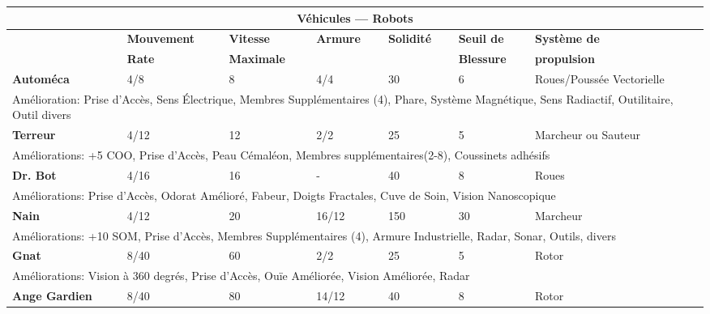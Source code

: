 \begin{table} \begin{tabular}{|l|l|l|l|l|l|l|} \hline

\multicolumn{7}{|c|}{\textbf{Véhicules --- Robots}} \\ \hline

&\textbf{Mouvement}	&\textbf{Vitesse}	&\textbf{Armure}	&\textbf{Solidité}	&\textbf{Seuil de}	&\textbf{Système de} \\ &\textbf{Rate}	&\textbf{Maximale}	&&&\textbf{Blessure}	&\textbf{propulsion} \\ \hline

\textbf{Automéca}	&4/8	&8	&4/4	&30	&6	&Roues/Poussée Vectorielle \\ \hline

\multicolumn{7}{|l|}{Amélioration: Prise d'Accès, Sens Électrique, Membres Supplémentaires (4), Phare, Système Magnétique, Sens Radiactif, Outilitaire, Outil divers} \\ \hline

\textbf{Terreur}	&4/12	&12	&2/2	&25	&5	&Marcheur ou Sauteur\\ \hline

\multicolumn{7}{|l|}{Améliorations: +5 COO, Prise d'Accès, Peau Cémaléon, Membres supplémentaires(2-8), Coussinets adhésifs} \\ \hline

\textbf{Dr. Bot}	&4/16	&16	&- &40	&8	&Roues\\ \hline

\multicolumn{7}{|l|}{Améliorations: Prise d'Accès, Odorat Amélioré, Fabeur, Doigts Fractales, Cuve de Soin, Vision Nanoscopique} \\ \hline

\textbf{Nain}	&4/12	&20	&16/12	&150	&30	&Marcheur\\ \hline

\multicolumn{7}{|l|}{Améliorations: +10 SOM, Prise d'Accès, Membres Supplémentaires (4), Armure Industrielle, Radar, Sonar, Outils, divers} \\ \hline

\textbf{Gnat}	&8/40	&60	&2/2	&25	&5	&Rotor \\ \hline

\multicolumn{7}{|l|}{Améliorations: Vision à 360 degrés, Prise d'Accès, Ouïe Améliorée, Vision Améliorée, Radar} \\ \hline

\textbf{Ange Gardien}	&8/40	&80	&14/12	&40	&8	&Rotor \\ \hline


\end{tabular}
\end{table}
